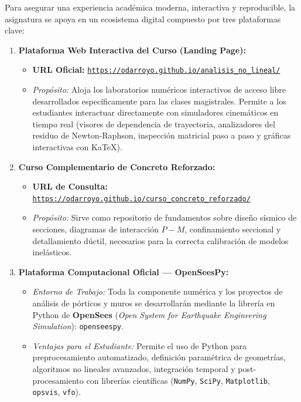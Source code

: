 \documentclass[11pt,letterpaper]{article}
\begin{document}
\begin{resourcebox}
Para asegurar una experiencia académica moderna, interactiva y reproducible, la asignatura se apoya en un ecosistema digital compuesto por tres plataformas clave:

\begin{enumerate}
    \item \textbf{Plataforma Web Interactiva del Curso (Landing Page):}
    \begin{itemize}
        \item \textbf{URL Oficial:} \href{https://odarroyo.github.io/analisis_no_lineal/}{\texttt{https://odarroyo.github.io/analisis\_no\_lineal/}}
        \item \textit{Propósito:} Aloja los laboratorios numéricos interactivos de acceso libre desarrollados específicamente para las clases magistrales. Permite a los estudiantes interactuar directamente con simuladores cinemáticos en tiempo real (visores de dependencia de trayectoria, analizadores del residuo de Newton-Raphson, inspección matricial paso a paso y gráficas interactivas con KaTeX).
    \end{itemize}

    \item \textbf{Curso Complementario de Concreto Reforzado:}
    \begin{itemize}
        \item \textbf{URL de Consulta:} \href{https://odarroyo.github.io/curso_concreto_reforzado/}{\texttt{https://odarroyo.github.io/curso\_concreto\_reforzado/}}
        \item \textit{Propósito:} Sirve como repositorio de fundamentos sobre diseño sísmico de secciones, diagramas de interacción $P-M$, confinamiento seccional y detallamiento dúctil, necesarios para la correcta calibración de modelos inelásticos.
    \end{itemize}

    \item \textbf{Plataforma Computacional Oficial --- OpenSeesPy:}
    \begin{itemize}
        \item \textit{Entorno de Trabajo:} Toda la componente numérica y los proyectos de análisis de pórticos y muros se desarrollarán mediante la librería en Python de \textbf{OpenSees} (\textit{Open System for Earthquake Engineering Simulation}): \texttt{openseespy}.
        \item \textit{Ventajas para el Estudiante:} Permite el uso de Python para preprocesamiento automatizado, definición paramétrica de geometrías, algoritmos no lineales avanzados, integración temporal y post-procesamiento con librerías científicas (\texttt{NumPy}, \texttt{SciPy}, \texttt{Matplotlib}, \texttt{opsvis}, \texttt{vfo}).
    \end{itemize}


\end{enumerate}
\end{resourcebox}
\end{document}
